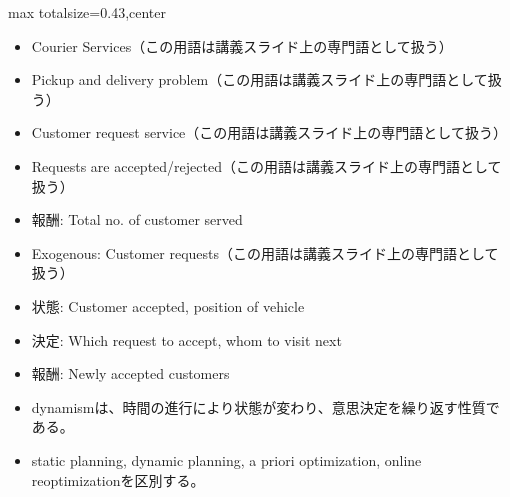 \clearpage
{}
\begin{minipage}[t]{0.405\textwidth}
\begin{adjustbox}{max totalsize={\textwidth}{0.43\textheight},center}
\begin{minipage}{\textwidth}\scriptsize
{}\begin{itemize}
\item Courier Services（この用語は講義スライド上の専門語として扱う）
\item Pickup and delivery problem（この用語は講義スライド上の専門語として扱う）
\item Customer request service（この用語は講義スライド上の専門語として扱う）
\item Requests are accepted/rejected（この用語は講義スライド上の専門語として扱う）
\item 報酬: Total no. of customer served
\item Exogenous: Customer requests（この用語は講義スライド上の専門語として扱う）
\item 状態: Customer accepted, position of vehicle
\item 決定: Which request to accept, whom to visit next
\item 報酬: Newly accepted customers
\end{itemize}\begin{itemize}
\item dynamismは、時間の進行により状態が変わり、意思決定を繰り返す性質である。
\item static planning, dynamic planning, a priori optimization, online reoptimizationを区別する。
\end{itemize}
\end{minipage}
\end{adjustbox}
\end{minipage}\hfill
